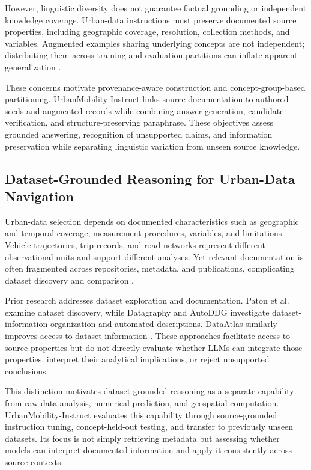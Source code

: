 \documentclass[a4paper,fleqn]{cas-sc}
\begin{document}
However, linguistic diversity does not guarantee factual grounding or independent knowledge coverage. Urban-data instructions must preserve documented source properties, including geographic coverage, resolution, collection methods, and variables. Augmented examples sharing underlying concepts are not independent; distributing them across training and evaluation partitions can inflate apparent generalization \cite{kaufman2012leakage}.

These concerns motivate provenance-aware construction and concept-group-based partitioning. UrbanMobility-Instruct links source documentation to authored seeds and augmented records while combining answer generation, candidate verification, and structure-preserving paraphrase. These objectives assess grounded answering, recognition of unsupported claims, and information preservation while separating linguistic variation from unseen source knowledge.

\subsection{Dataset-Grounded Reasoning for Urban-Data Navigation}

Urban-data selection depends on documented characteristics such as geographic and temporal coverage, measurement procedures, variables, and limitations. Vehicle trajectories, trip records, and road networks represent different observational units and support different analyses. Yet relevant documentation is often fragmented across repositories, metadata, and publications, complicating dataset discovery and comparison \cite{paton2023dataset,petit2025datagraphy}.

Prior research addresses dataset exploration and documentation. Paton et al. \cite{paton2023dataset} examine dataset discovery, while Datagraphy \cite{petit2025datagraphy} and AutoDDG \cite{zhang2026autoddg} investigate dataset-information organization and automated descriptions. DataAtlas similarly improves access to dataset information \cite{giancotti2026dataatlas}. These approaches facilitate access to source properties but do not directly evaluate whether LLMs can integrate those properties, interpret their analytical implications, or reject unsupported conclusions.

This distinction motivates dataset-grounded reasoning as a separate capability from raw-data analysis, numerical prediction, and geospatial computation. UrbanMobility-Instruct evaluates this capability through source-grounded instruction tuning, concept-held-out testing, and transfer to previously unseen datasets. Its focus is not simply retrieving metadata but assessing whether models can interpret documented information and apply it consistently across source contexts.
\end{document}
